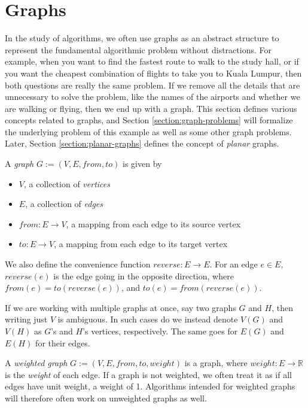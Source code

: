\section{Graphs}
\label{section:graphs}
In the study of algorithms, we often use graphs as an abstract structure to represent the fundamental algorithmic problem without distractions. For example, when you want to find the fastest route to walk to the study hall, or if you want the cheapest combination of flights to take you to Kuala Lumpur, then both questions are really the same problem. If we remove all the details that are unnecessary to solve the problem, like the names of the airports and whether we are walking or flying, then we end up with a graph. This section defines various concepts related to graphs, and Section \ref{section:graph-problems} will formalize the underlying problem of this example as well as some other graph problems. Later, Section \ref{section:planar-graphs} defines the concept of \emph{planar} graphs.

\begin{definition}[Graph]
    A \emph{graph} $G := (V, E, from, to)$ is given by
\begin{itemize}
    \item $V$, a collection of \emph{vertices}
    \item $E$, a collection of \emph{edges}
    \item $from : E \rightarrow V$, a mapping from each edge to its source vertex
    \item $to : E \rightarrow V$, a mapping from each edge to its target vertex 
\end{itemize}
\end{definition}

We also define the convenience function $reverse : E \rightarrow E$. For an edge $e \in E$, $reverse(e)$ is the edge going in the opposite direction, where $from(e) = to(reverse(e))$, and $to(e) = from(reverse(e))$.

If we are working with multiple graphs at once, say two graphs $G$ and $H$, then writing just $V$ is ambiguous. In such cases do we instead denote $V(G)$ and $V(H)$ as $G$'s and $H$'s vertices, respectively. The same goes for $E(G)$ and $E(H)$ for their edges.

\begin{definition}
    A \emph{weighted graph} $G := (V, E, from, to, weight)$ is a graph, where $weight : E \rightarrow \mathbb{R}$ is the \emph{weight} of each edge. If a graph is not weighted, we often treat it as if all edges have unit weight, a weight of 1. Algorithms intended for weighted graphs will therefore often work on unweighted graphs as well.
\end{definition}

